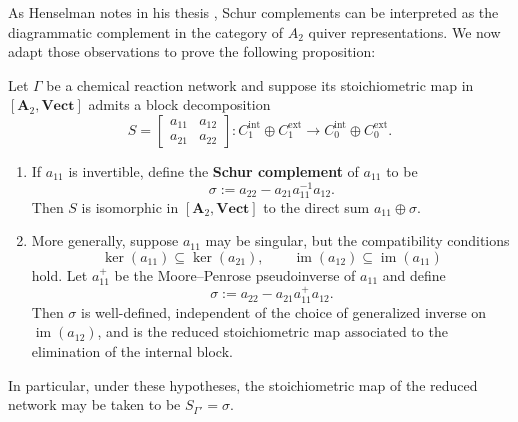 \documentclass[11pt, one side, article]{memoir}
\newcommand{\define}[1]{\textbf{#1}}
\begin{document}
As Henselman notes in his thesis \cite{henselman2017matroids}, Schur complements can be interpreted as the diagrammatic complement in the category of $A_2$ quiver representations.
We now adapt those observations to prove the following proposition:
\begin{proposition}\label{prop:Schur}
    Let $\Gamma$ be a chemical reaction network and suppose its stoichiometric map in $[\mathbf{A}_2,\mathbf{Vect}]$ admits a block decomposition
    \[
    S =
    \begin{bmatrix}
     a_{11} & a_{12}\\
     a_{21} & a_{22}
    \end{bmatrix}
    :
    C_1^{\mathrm{int}} \oplus C_1^{\mathrm{ext}}
    \longrightarrow
    C_0^{\mathrm{int}} \oplus C_0^{\mathrm{ext}}.
    \]
    
    \begin{enumerate}
        \item If $a_{11}$ is invertible, define the \define{Schur complement} of $a_{11}$ to be
        \[
            \sigma := a_{22} - a_{21}a_{11}^{-1}a_{12}.
        \]
        Then $S$ is isomorphic in $[\mathbf{A}_2,\mathbf{Vect}]$ to the direct sum $a_{11} \oplus \sigma$.
    
        \item More generally, suppose $a_{11}$ may be singular, but the compatibility conditions
        \[
            \ker(a_{11}) \subseteq \ker(a_{21}),
            \qquad
            \operatorname{im}(a_{12}) \subseteq \operatorname{im}(a_{11})
        \]
        hold. Let $a_{11}^+$ be the Moore--Penrose pseudoinverse of $a_{11}$ and define
        \[
            \sigma := a_{22} - a_{21}a_{11}^+a_{12}.
        \]
        Then $\sigma$ is well-defined, independent of the choice of generalized inverse on $\operatorname{im}(a_{12})$, and is the reduced stoichiometric map associated to the elimination of the internal block.
    \end{enumerate}
    In particular, under these hypotheses, the stoichiometric map of the reduced network may be taken to be $S_{\Gamma'} = \sigma$.
\end{proposition}
\end{document}
